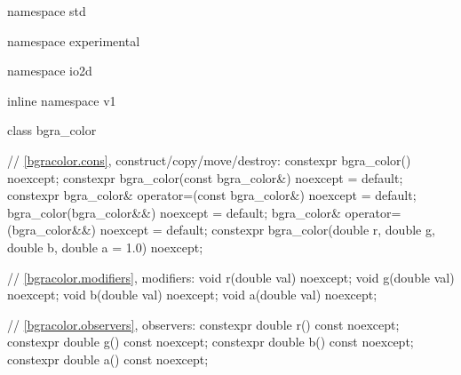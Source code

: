 \begin{codeblock}
namespace std { namespace experimental { namespace io2d { inline namespace v1 {
  class bgra_color {
    // \ref{bgracolor.cons}, construct/copy/move/destroy:
    constexpr bgra_color() noexcept;
    constexpr bgra_color(const bgra_color&) noexcept = default;
    constexpr bgra_color& operator=(const bgra_color&) noexcept = default;
    bgra_color(bgra_color&&) noexcept = default;
    bgra_color& operator=(bgra_color&&) noexcept = default;
    constexpr bgra_color(double r, double g, double b, double a = 1.0) noexcept;
  
    // \ref{bgracolor.modifiers}, modifiers:
    void r(double val) noexcept;
    void g(double val) noexcept;
    void b(double val) noexcept;
    void a(double val) noexcept;
    
    // \ref{bgracolor.observers}, observers:
    constexpr double r() const noexcept;
    constexpr double g() const noexcept;
    constexpr double b() const noexcept;
    constexpr double a() const noexcept;
    
}}}}}
\end{codeblock}
